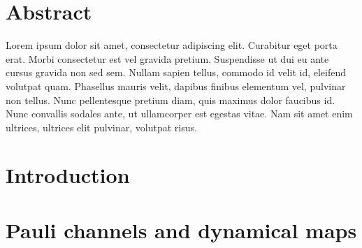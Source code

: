 \documentclass[10pt,letterpaper]{article} %
\begin{document}
\section*{Abstract}
Lorem ipsum dolor sit amet, consectetur adipiscing elit. Curabitur eget porta erat. Morbi consectetur est vel gravida pretium. Suspendisse ut dui eu ante cursus gravida non sed sem. Nullam sapien tellus, commodo id velit id, eleifend volutpat quam. Phasellus mauris velit, dapibus finibus elementum vel, pulvinar non tellus. Nunc pellentesque pretium diam, quis maximus dolor faucibus id. Nunc convallis sodales ante, ut ullamcorper est egestas vitae. Nam sit amet enim ultrices, ultrices elit pulvinar, volutpat risus.



\linenumbers

\section{Introduction} %


\section{Pauli channels and dynamical maps}  \label{sec: Pauli Channels} %
\end{document}
